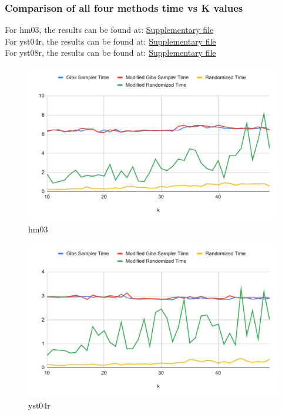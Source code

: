 \documentclass{article}
\begin{document}
\subsubsection{Comparison of all four methods time vs K values}
For hm03, the results can be found at: \href{https://docs.google.com/spreadsheets/d/1NLuWuYod4BafkorDmi3lj8y2_z9ZDeY42Y-eZODlBIA/edit#gid=350517146}{Supplementary file}\\
For yst04r, the results can be found at: \href{https://docs.google.com/spreadsheets/d/1NLuWuYod4BafkorDmi3lj8y2_z9ZDeY42Y-eZODlBIA/edit#gid=672921087}{Supplementary file}\\
For yst08r, the results can be found at: \href{https://docs.google.com/spreadsheets/d/1NLuWuYod4BafkorDmi3lj8y2_z9ZDeY42Y-eZODlBIA/edit#gid=1580678368}{Supplementary file}
\begin{figure}[!hptb]
    \centering
    \includegraphics[scale=0.7]{Figs/chart_time_hm03.pdf}
    \caption{hm03}    
\end{figure}
\begin{figure}[!hptb]
    \centering
    \includegraphics[scale=0.7]{Figs/chart_time_yst04r.pdf}
    \caption{yst04r}    
\end{figure}
\end{document}
